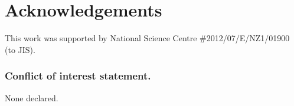 \documentclass[a4,center,fleqn]{NAR}
\begin{document}
\section{Acknowledgements}

This work was supported by National Science Centre \#2012/07/E/NZ1/01900 (to JIS).


\subsubsection{Conflict of interest statement.} None declared.



\end{document}
